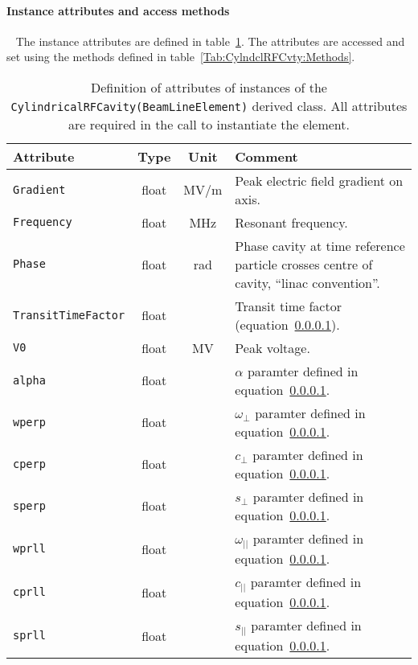 \paragraph{Instance attributes and access methods} ~\newline
\label{SubSubSect:CylndclRFCvty:InstAttr}
\noindent
The instance attributes are defined in
table~\ref{Tab:CylndclRFCvty:Attributes}. 
The attributes are accessed and set using the methods defined in
table~\ref{Tab:CylndclRFCvty:Methods}.
\begin{table}[h]
  \caption{
    Definition of attributes of instances of
    the \texttt{CylindricalRFCavity(BeamLineElement)} derived class.
    All attributes are required in the call to instantiate the
    element.
  }
  \label{Tab:CylndclRFCvty:Attributes}
  \begin{center}
    \begin{tabular}{|l|c|c|p{10cm}|}
      \hline
      \textbf{Attribute}   & \textbf{Type} & \textbf{Unit} & \textbf{Comment}                    \\
      \hline
      \texttt{Gradient}          & float & MV/m  & Peak electric field gradient on axis.         \\
      \texttt{Frequency}         & float & MHz   & Resonant frequency.                           \\
      \texttt{Phase}             & float & rad   & Phase cavity at time reference particle crosses
                                                   centre of cavity, ``linac convention''.       \\
      \texttt{TransitTimeFactor} & float &       & Transit time factor (equation~\ref{}).        \\
      \texttt{V0}                & float & MV    & Peak voltage.                                 \\
      \texttt{alpha}             & float &       & $\alpha$ paramter defined in equation~\ref{}. \\
      \texttt{wperp}             & float &       & $\omega_\perp$ paramter defined in equation~\ref{}. \\
      \texttt{cperp}             & float &       & $c_\perp$ paramter defined in equation~\ref{}. \\
      \texttt{sperp}             & float &       & $s_\perp$ paramter defined in equation~\ref{}. \\
      \texttt{wprll}             & float &       & $\omega_{||}$ paramter defined in equation~\ref{}. \\
      \texttt{cprll}             & float &       & $c_{||}$ paramter defined in equation~\ref{}. \\
      \texttt{sprll}             & float &       & $s_{||}$ paramter defined in equation~\ref{}. \\
      \hline
    \end{tabular}
  \end{center}
\end{table}
